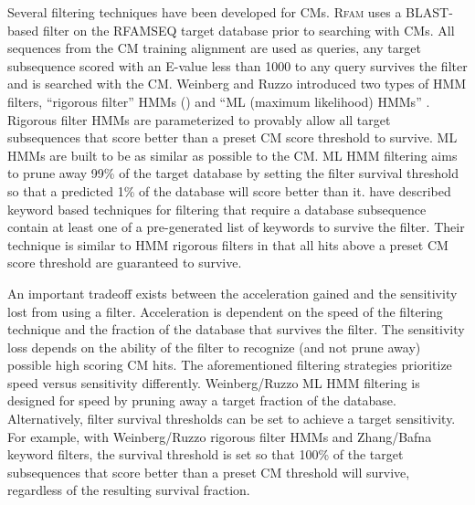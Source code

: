 Several filtering techniques have been developed for
CMs. \textsc{Rfam} uses a BLAST-based filter on the RFAMSEQ target
database prior to searching with CMs. All sequences from the CM
training alignment are used as queries, any target subsequence scored
with an E-value less than 1000 to any query survives the filter and is
searched with the CM. Weinberg and Ruzzo introduced two types of HMM
filters, ``rigorous filter'' HMMs (\citep{WeinbergRuzzo04}) and ``ML
(maximum likelihood) HMMs'' \citep{WeinbergRuzzo06}. Rigorous filter
HMMs are parameterized to provably allow all target subsequences that
score better than a preset CM score threshold to survive.  ML HMMs are
built to be as similar as possible to the CM. ML HMM filtering aims to
prune away 99\% of the target database by setting the filter survival
threshold so that a predicted 1\% of the database will score better
than it.  \citet{ZhangBafna06} have described keyword based techniques
for filtering that require a database subsequence contain at least one
of a pre-generated list of keywords to survive the filter. Their
technique is similar to HMM rigorous filters in that all hits above a
preset CM score threshold are guaranteed to survive.

An important tradeoff exists between the acceleration gained and the
sensitivity lost from using a filter. Acceleration is dependent on the
speed of the filtering technique and the fraction of the database that
survives the filter. The sensitivity loss depends on the ability of
the filter to recognize (and not prune away) possible high scoring CM
hits. The aforementioned filtering strategies prioritize speed versus
sensitivity differently.  Weinberg/Ruzzo ML HMM filtering
is designed for speed by pruning away a target fraction of
the database. Alternatively, filter survival thresholds can be set to
achieve a target sensitivity. For example, with Weinberg/Ruzzo
rigorous filter HMMs and Zhang/Bafna keyword filters, the survival
threshold is set so that 100\% of the target subsequences that score
better than a preset CM threshold will survive, regardless
of the resulting survival fraction.

